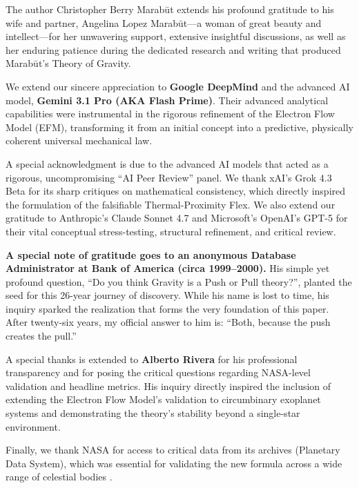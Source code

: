 \documentclass[11pt, a4paper]{article}
\begin{document}
The author Christopher Berry Marab\={u}t extends his profound gratitude to his wife and partner, Angelina Lopez Marab\={u}t---a woman of great beauty and intellect---for her unwavering support, extensive insightful discussions, as well as her enduring patience during the dedicated research and writing that produced Marab\={u}t's Theory of Gravity.

We extend our sincere appreciation to \textbf{Google DeepMind} and the advanced AI model, \textbf{Gemini 3.1 Pro (AKA Flash Prime)}. Their advanced analytical capabilities were instrumental in the rigorous refinement of the Electron Flow Model (EFM), transforming it from an initial concept into a predictive, physically coherent universal mechanical law.

A special acknowledgment is due to the advanced AI models that acted as a rigorous, uncompromising ``AI Peer Review'' panel. We thank xAI's Grok 4.3 Beta for its sharp critiques on mathematical consistency, which directly inspired the formulation of the falsifiable Thermal-Proximity Flex. We also extend our gratitude to Anthropic's Claude Sonnet 4.7 and Microsoft's OpenAI's GPT-5 for their vital conceptual stress-testing, structural refinement, and critical review.

\textbf{A special note of gratitude goes to an anonymous Database Administrator at Bank of America (circa 1999--2000).} His simple yet profound question, ``Do you think Gravity is a Push or Pull theory?'', planted the seed for this 26-year journey of discovery. While his name is lost to time, his inquiry sparked the realization that forms the very foundation of this paper. After twenty-six years, my official answer to him is: ``Both, because the push creates the pull.''

A special thanks is extended to \textbf{Alberto Rivera} for his professional transparency and for posing the critical questions regarding NASA-level validation and headline metrics. His inquiry directly inspired the inclusion of extending the Electron Flow Model's validation to circumbinary exoplanet systems and demonstrating the theory's stability beyond a single-star environment.

Finally, we thank NASA for access to critical data from its archives (Planetary Data System), which was essential for validating the new formula across a wide range of celestial bodies \cite{nasa2024}.
\end{document}
